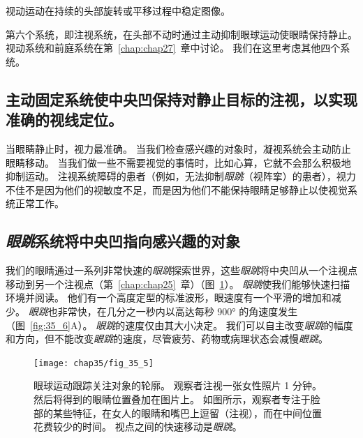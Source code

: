 视动运动在持续的头部旋转或平移过程中稳定图像。


第六个系统，即注视系统，在头部不动时通过主动抑制眼球运动使眼睛保持静止。
视动系统和前庭系统在第~\ref{chap:chap27}~章中讨论。
我们在这里考虑其他四个系统。



\subsection{主动固定系统使中央凹保持对静止目标的注视，以实现准确的视线定位。}

当眼睛静止时，视力最准确。
当我们检查感兴趣的对象时，凝视系统会主动防止眼睛移动。
当我们做一些不需要视觉的事情时，比如心算，它就不会那么积极地抑制运动。
注视系统障碍的患者（例如，无法抑制\textit{眼跳}（视阵挛）的患者），视力不佳不是因为他们的视敏度不足，而是因为他们不能保持眼睛足够静止以使视觉系统正常工作。



\subsection{\textit{眼跳}系统将中央凹指向感兴趣的对象}

我们的眼睛通过一系列非常快速的\textit{眼跳}探索世界，这些\textit{眼跳}将中央凹从一个注视点移动到另一个注视点（第~\ref{chap:chap25}~章）（图~\ref{fig:35_5}）。
\textit{眼跳}使我们能够快速扫描环境并阅读。 
他们有一个高度定型的标准波形，眼速度有一个平滑的增加和减少。
\textit{眼跳}也非常快，在几分之一秒内以高达每秒 900° 的角速度发生（图~\ref{fig:35_6}A）。
\textit{眼跳}的速度仅由其大小决定。
我们可以自主改变\textit{眼跳}的幅度和方向，但不能改变\textit{眼跳}的速度，尽管疲劳、药物或病理状态会减慢\textit{眼跳}。


\begin{figure}[htbp]
	\centering
	\texttt{[image: chap35/fig\_35\_5]}
	\caption{眼球运动跟踪关注对象的轮廓。
		观察者注视一张女性照片 1 分钟。
		然后将得到的眼睛位置叠加在图片上。
		如图所示，观察者专注于脸部的某些特征，在女人的眼睛和嘴巴上逗留（注视），而在中间位置花费较少的时间。 
		视点之间的快速移动是\textit{眼跳}\cite{yarbus2013eye}。}
	\label{fig:35_5}
\end{figure}



